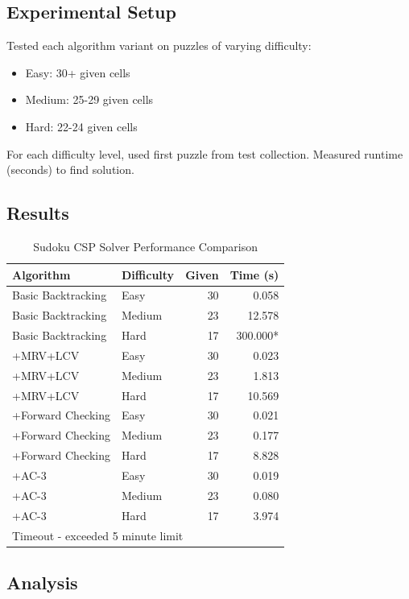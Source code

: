 \documentclass[letterpaper]{article}
\begin{document}
\subsection{Experimental Setup}

Tested each algorithm variant on puzzles of varying difficulty:
\begin{itemize}
\item Easy: 30+ given cells
\item Medium: 25-29 given cells
\item Hard: 22-24 given cells
\end{itemize}

For each difficulty level, used first puzzle from test collection. Measured runtime (seconds) to find solution.

\subsection{Results}

\begin{table}[h]
\centering
\caption{Sudoku CSP Solver Performance Comparison}
\label{tab:sudoku-results}
\begin{tabular}{@{}llrr@{}}
\toprule
\textbf{Algorithm} & \textbf{Difficulty} & \textbf{Given} & \textbf{Time (s)} \\
\midrule
Basic Backtracking & Easy & 30 & 0.058 \\
Basic Backtracking & Medium & 23 & 12.578 \\
Basic Backtracking & Hard & 17 & 300.000* \\
\midrule
+MRV+LCV & Easy & 30 & 0.023 \\
+MRV+LCV & Medium & 23 & 1.813 \\
+MRV+LCV & Hard & 17 & 10.569 \\
\midrule
+Forward Checking & Easy & 30 & 0.021 \\
+Forward Checking & Medium & 23 & 0.177 \\
+Forward Checking & Hard & 17 & 8.828 \\
\midrule
+AC-3 & Easy & 30 & 0.019 \\
+AC-3 & Medium & 23 & 0.080 \\
+AC-3 & Hard & 17 & 3.974 \\
\bottomrule
\multicolumn{4}{l}{\footnotesize *Timeout - exceeded 5 minute limit}
\end{tabular}
\end{table}

\subsection{Analysis}
\end{document}

